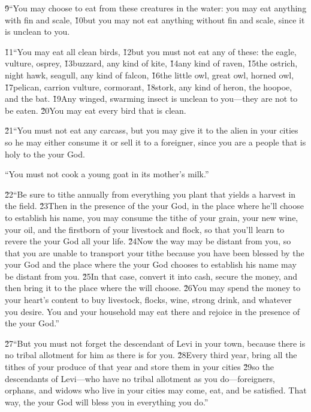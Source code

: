 \v{9}``You may choose to eat from these creatures in the water: you may eat anything with fin and scale, \v{10}but you may not eat anything without fin and scale, since it is unclean to you.

\v{11}``You may eat all clean birds, \v{12}but you must not eat any of these: the eagle, vulture, osprey, \v{13}buzzard, any kind of kite, \v{14}any kind of raven, \v{15}the ostrich, night hawk, seagull, any kind of falcon, \v{16}the little owl, great owl, horned owl, \v{17}pelican, carrion vulture, cormorant, \v{18}stork, any kind of heron, the hoopoe, and the bat. \v{19}Any winged, swarming insect is unclean to you---they are not to be eaten. \v{20}You may eat every bird that is clean.

\v{21}``You must not eat any carcass, but you may give it to the alien in your cities so he may either consume it or sell it to a foreigner, since you are a people that is holy to the  your God.

``You must not cook a young goat in its mother's milk.''

\v{22}``Be sure to tithe annually from everything you plant that yields a harvest in the field. \v{23}Then in the presence of the  your God, in the place where he'll choose to establish his name, you may consume the tithe of your grain, your new wine, your oil, and the firstborn of your livestock and flock, so that you'll learn to revere the  your God all your life. \v{24}Now the way may be distant from you, so that you are unable to transport your tithe because you have been blessed by the  your God and the place where the  your God chooses to establish his name may be distant from you. \v{25}In that case, convert it into cash, secure the money, and then bring it to the place where the  will choose. \v{26}You may spend the money to your heart's content to buy livestock, flocks, wine, strong drink, and whatever you desire. You and your household may eat there and rejoice in the presence of the  your God.''

\v{27}``But you must not forget the descendant of Levi in your town, because there is no tribal allotment for him as there is for you. \v{28}Every third year, bring all the tithes of your produce of that year and store them in your cities \v{29}so the descendants of Levi---who have no tribal allotment as you do---foreigners, orphans, and widows who live in your cities may come, eat, and be satisfied. That way, the  your God will bless you in everything you do.''

